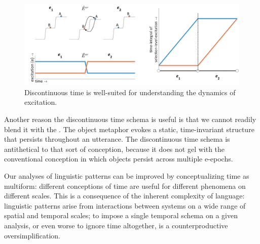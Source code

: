   
\begin{figure}
\includegraphics[width=\textwidth]{figures/Tilsen-img50.png}
\caption{Discontinuous time is well-suited for understanding the dynamics of excitation.}
\label{fig:3:22}
\end{figure}
 

  Another reason the discontinuous time schema is useful is that we cannot readily blend it with the {}. The object metaphor evokes a static, time-invariant structure that persists throughout an utterance. The discontinuous time schema is antithetical to that sort of conception, because it does not gel with the conventional conception in which objects persist across multiple e-epochs. 

  Our analyses of linguistic patterns can be improved by conceptualizing time as multiform: different conceptions of time are useful for different phenomena on different scales. This is a consequence of the inherent complexity of language: linguistic patterns arise from interactions between systems on a wide range of spatial and temporal scales; to impose a single temporal schema on a given analysis, or even worse to ignore time altogether, is a counterproductive oversimplification. 

